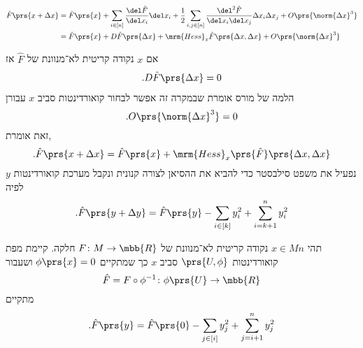 \documentclass[a4paper,10pt,twoside,openany]{book}
\begin{document}
\begin{align*}
\hat{F}\prs{x+\Delta x} &= \hat{F}\prs{x} + \sum_{i \in [n]} \frac{\del \hat{F}}{\del x_i} \del x_i + \frac{1}{2} \sum_{i,j \in [n]} \frac{\del^2 \hat{F}}{\del x_i \del x_j} \Delta x_i \Delta x_j + O\prs{\norm{\Delta x}^3}
\\&=
\hat{F}\prs{x} + D \hat{F}\prs{\Delta x} + \mrm{Hess}_x\hat{F}\prs{\Delta x, \Delta x} + O\prs{\norm{\Delta x}^3}
\end{align*}

אם
$x$
נקודה קריטית לא־מנוונת של
$\hat{F}$
אז
\begin{align*}
\text{.} D \hat{F}\prs{\Delta x} = 0
\end{align*}
הלמה של מורס אומרת שבמקרה זה אפשר לבחור קואורדינטות סביב
$x$
עבורן
\[\text{.} O\prs{\norm{\Delta x}^3} = 0\]
זאת אומרת,
\[\text{.} \hat{F}\prs{x + \Delta x} = \hat{F}\prs{x} + \mrm{Hess}_x\prs{\hat{F}} \prs{\Delta x, \Delta x}\]
נפעיל את משפט סילבסטר כדי להביא את ההסיאן לצורה קנונית ונקבל מערכת קואורדינטות
$y$
לפיה
\begin{align*}
\text{.} \hat{F}\prs{y + \Delta y} = \hat{F}\prs{y} - \sum_{i \in [k]} y_i^2 + \sum_{i = k+1}^n y_i^2
\end{align*}

\begin{theorem}
תהי
$x \in Mn$
נקודה קריטית לא־מנוונת של
$F \colon M \to \mbb{R}$
חלקה.
קיימת מפת קואורדינטות
$\prs{U,\phi}$
סביב
$x$
כך שמתקיים
$\phi\prs{x} = 0$
ושעבור
\[\hat{F} = F \circ \phi^{-1} \colon \phi\prs{U} \to \mbb{R}\]
מתקיים
\begin{align*}
\text{.} \hat{F}\prs{y} = \hat{F}\prs{0} - \sum_{j \in [i]} y_j^2 + \sum_{j = i+1}^n y_j^2
\end{align*}
\end{theorem}
\end{document}
